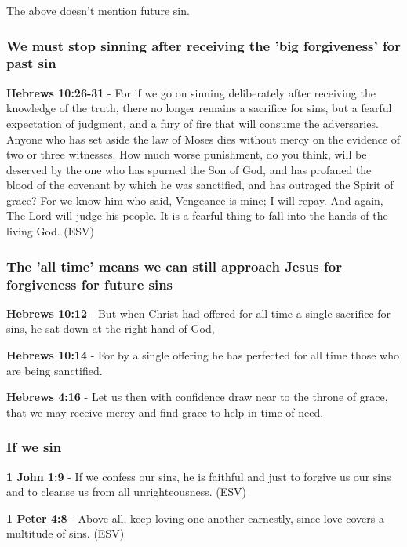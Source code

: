 \documentclass[11pt]{article}
\begin{document}
The above doesn't mention future sin.

\subsubsection{We must stop sinning after receiving the 'big forgiveness' for past sin}
\label{sec:org0eeba43}
\textbf{Hebrews 10:26-31} -  For if we go on sinning deliberately after receiving the knowledge of the truth, there no longer remains a sacrifice for sins, but a fearful expectation of judgment, and a fury of fire that will consume the adversaries.  Anyone who has set aside the law of Moses dies without mercy on the evidence of two or three witnesses.  How much worse punishment, do you think, will be deserved by the one who has spurned the Son of God, and has profaned the blood of the covenant by which he was sanctified, and has outraged the Spirit of grace?  For we know him who said, Vengeance is mine; I will repay.  And again, The Lord will judge his people.  It is a fearful thing to fall into the hands of the living God.  (ESV)

\subsubsection{The 'all time' means we can still approach Jesus for forgiveness for future sins}
\label{sec:orga11704c}
\textbf{Hebrews 10:12} - But when Christ had offered for all time a single sacrifice for sins, he sat down at the right hand of God,

\textbf{Hebrews 10:14} - For by a single offering he has perfected for all time those who are being sanctified.

\textbf{Hebrews 4:16} - Let us then with confidence draw near to the throne of grace, that we may receive mercy and find grace to help in time of need.

\subsubsection{If we sin}
\label{sec:org85937bb}
\textbf{1 John 1:9} -  If we confess our sins, he is faithful and just to forgive us our sins and to cleanse us from all unrighteousness.  (ESV)

\textbf{1 Peter 4:8} -  Above all, keep loving one another earnestly, since love covers a multitude of sins.  (ESV)
\end{document}
